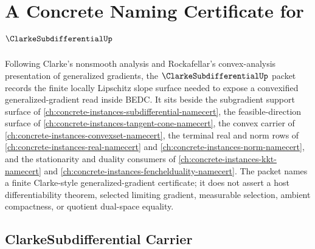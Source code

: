 \chapter{A Concrete Naming Certificate for $\ClarkeSubdifferentialUp$}
\label{ch:concrete-instances-clarke-subdifferential-namecert}

Following Clarke's nonsmooth analysis and Rockafellar's convex-analysis presentation of generalized gradients, the $\ClarkeSubdifferentialUp$ packet records the finite locally Lipschitz slope surface needed to expose a convexified generalized-gradient read inside BEDC. It sits beside the subgradient support surface of \autoref{ch:concrete-instances-subdifferential-namecert}, the feasible-direction surface of \autoref{ch:concrete-instances-tangent-cone-namecert}, the convex carrier of \autoref{ch:concrete-instances-convexset-namecert}, the terminal real and norm rows of \autoref{ch:concrete-instances-real-namecert} and \autoref{ch:concrete-instances-norm-namecert}, and the stationarity and duality consumers of \autoref{ch:concrete-instances-kkt-namecert} and \autoref{ch:concrete-instances-fenchelduality-namecert}. The packet names a finite Clarke-style generalized-gradient certificate; it does not assert a host differentiability theorem, selected limiting gradient, measurable selection, ambient compactness, or quotient dual-space equality.

\section{ClarkeSubdifferential Carrier}
\label{sec:clarke-subdifferential-carrier}

